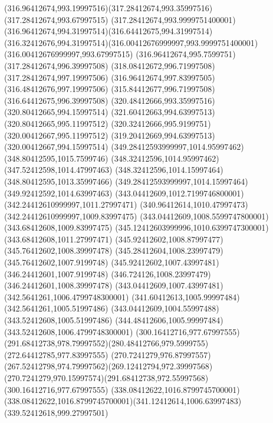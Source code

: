 {{	\curveto(316.96412674,993.19997516)(317.28412674,993.35997516)(317.28412674,993.67997515)
	\curveto(317.28412674,993.9999751400001)(316.96412674,994.31997514)(316.64412675,994.31997514)
	\curveto(316.32412676,994.31997514)(316.00412676999997,993.9999751400001)(316.00412676999997,993.67997515)
	\closepath
	\moveto(316.96412674,995.7599751)
	\lineto(317.28412674,996.39997508)
	\lineto(318.08412672,996.71997508)
	\lineto(317.28412674,997.19997506)
	\lineto(316.96412674,997.83997505)
	\lineto(316.48412676,997.19997506)
	\lineto(315.84412677,996.71997508)
	\lineto(316.64412675,996.39997508)
	\closepath
	\moveto(320.48412666,993.35997516)
	\lineto(320.80412665,994.15997514)
	\lineto(321.60412663,994.63997513)
	\lineto(320.80412665,995.11997512)
	\lineto(320.32412666,995.9199751)
	\lineto(320.00412667,995.11997512)
	\lineto(319.20412669,994.63997513)
	\lineto(320.00412667,994.15997514)
	\closepath
	\moveto(349.28412593999997,1014.95997462)
	\lineto(348.80412595,1015.7599746)
	\lineto(348.32412596,1014.95997462)
	\lineto(347.52412598,1014.47997463)
	\lineto(348.32412596,1014.15997464)
	\lineto(348.80412595,1013.35997466)
	\lineto(349.28412593999997,1014.15997464)
	\lineto(349.92412592,1014.63997463)
	\closepath
	\moveto(343.04412609,1012.7199746800001)
	\lineto(342.24412610999997,1011.27997471)
	\lineto(340.96412614,1010.47997473)
	\lineto(342.24412610999997,1009.83997475)
	\lineto(343.04412609,1008.5599747800001)
	\lineto(343.68412608,1009.83997475)
	\lineto(345.12412603999996,1010.6399747300001)
	\lineto(343.68412608,1011.27997471)
	\closepath
	\moveto(345.92412602,1008.87997477)
	\lineto(345.76412602,1008.39997478)
	\lineto(345.28412604,1008.23997479)
	\lineto(345.76412602,1007.9199748)
	\lineto(345.92412602,1007.43997481)
	\lineto(346.24412601,1007.9199748)
	\lineto(346.724126,1008.23997479)
	\lineto(346.24412601,1008.39997478)
	\closepath
	\moveto(343.04412609,1007.43997481)
	\lineto(342.5641261,1006.4799748300001)
	\lineto(341.60412613,1005.99997484)
	\lineto(342.5641261,1005.51997486)
	\lineto(343.04412609,1004.55997488)
	\lineto(343.52412608,1005.51997486)
	\lineto(344.48412606,1005.99997484)
	\lineto(343.52412608,1006.4799748300001)
	\closepath
	\moveto(300.16412716,977.67997555)
	\curveto(291.68412738,978.79997552)(280.48412766,979.5999755)(272.64412785,977.83997555)
	\curveto(270.7241279,976.87997557)(267.52412798,974.79997562)(269.12412794,972.39997568)
	\curveto(270.7241279,970.15997574)(291.68412738,972.55997568)(300.16412716,977.67997555)
	\closepath
	\moveto(338.08412622,1016.8799745700001)
	\curveto(338.08412622,1016.8799745700001)(341.12412614,1006.63997483)(339.52412618,999.27997501)
}}

